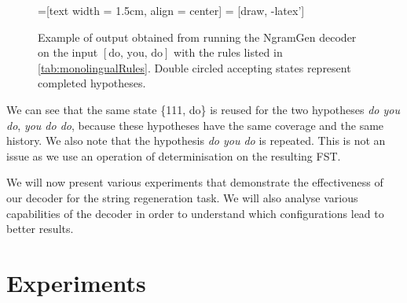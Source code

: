\begin{figure}
  \scriptsize
  =[text width = 1.5cm, align = center]
   = [draw, -latex']

  \begin{center}
  \end{center}
  \caption{Example of output obtained from running the NgramGen decoder
    on the input $[\text{do, you, do}]$ with the rules listed
    in \autoref{tab:monolingualRules}. Double circled accepting states
    represent completed hypotheses.}
  \label{fig:exampleAlgoGyro}
\end{figure}
%
We can see that the same state \{111, do\} is reused for
the two hypotheses \emph{do you do}, \emph{you do do}, because
these hypotheses have the same coverage and the same history.
We also note that the hypothesis \emph{do you do} is repeated.
This is not an issue as we use an operation of determinisation
on the resulting FST.

We will now present various experiments that demonstrate the effectiveness
of our decoder for the string regeneration task. We will also
analyse various capabilities of the decoder in order to
understand which configurations lead to better results.

\section{Experiments}

